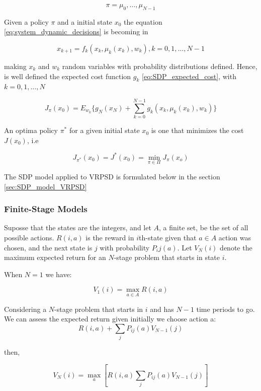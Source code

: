 \[\pi={\mu_0,\ldots,\mu_{N-1}}\]

Given a policy $\pi$ and a initial state $x_0$ the equation \ref{eq:system_dynamic_decisions} is becoming in 

\begin{equation}\label{eq:system_dynamic_policy}
x_{k+1}=f_k(x_k,\mu_k(x_k),w_k), k=0,1,\ldots,N-1 
\end{equation}

making $x_k$ and $w_k$ random variables with probability distributions defined. Hence, is well defined the expected cost function $g_k$ \ref{eq:SDP_expected_cost}, with $k=0,1,\ldots,N$

\begin{equation}\label{eq:SDP_expected_cost_policy}
 J_\pi(x_0) = E_{w_k}\biggr\{g_N(x_N)+\sum_{k=0}^{N-1}g_k(x_k,\mu_k(x_k),w_k)\biggr\}
\end{equation}

An optima policy $\pi^*$ for a given initial state $x_0$ is one that minimizes the cost $J(x_0)$, i.e

\[J_{\pi^*}(x_0)=J^*(x_0)=\min\limits_{\pi\in\Pi}J_\pi(x_o)\]


The SDP model applied to VRPSD is formulated below in the section \ref{sec:SDP_model_VRPSD}


\subsubsection{Finite-Stage Models}%


Suposse that the states are the integers, and let $A$, a finite set, be the set of all possible actions.
$R(i,a)$ is the reward in $i$th-state given that $a \in A$ action was chosen, and the next state is $j$ with probability $P_ij(a)$.
Let $V_N(i)$ denote the maximum expected return for an $N$-stage problem that starts in state $i$.

When $N=1$ we have:

\begin{equation}\label{eq:maxValueN=1}
 V_1(i) =  \max_{a\in A}R(i,a)
\end{equation}

Considering a $N$-stage problem that starts in $i$ and has $N-1$ time periods to go. We can assess the expected return given initially we choose action a:
\[R(i,a)+\sum_jP_{ij}(a)V_{N-1}(j)\]

then,

\begin{equation}
 V_N(i)=\max_a[R(i,a)\sum_jP_{ij}(a)V_{N-1}(j)]
\end{equation}

